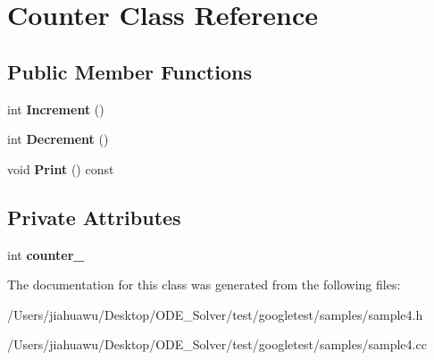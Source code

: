 \hypertarget{class_counter}{}\section{Counter Class Reference}
\label{class_counter}
\subsection*{Public Member Functions}
\begin{DoxyCompactItemize}
\item 
\mbox{\label{class_counter_a0a0ca9fdb580a2aec9a5a62ebed2b5ab}} 
int {\bfseries Increment} ()
\item 
\mbox{\label{class_counter_aa58d9b4f0bd96fc2331234493eb21bed}} 
int {\bfseries Decrement} ()
\item 
\mbox{\label{class_counter_a80092ec2a0deea0870b2e9f8ad0906bd}} 
void {\bfseries Print} () const
\end{DoxyCompactItemize}
\subsection*{Private Attributes}
\begin{DoxyCompactItemize}
\item 
\mbox{\label{class_counter_abdef0bf73f0a68177863c42c6eba2fc0}} 
int {\bfseries counter\+\_\+}
\end{DoxyCompactItemize}


The documentation for this class was generated from the following files\+:\begin{DoxyCompactItemize}
\item 
/\+Users/jiahuawu/\+Desktop/\+O\+D\+E\+\_\+\+Solver/test/googletest/samples/sample4.\+h\item 
/\+Users/jiahuawu/\+Desktop/\+O\+D\+E\+\_\+\+Solver/test/googletest/samples/sample4.\+cc\end{DoxyCompactItemize}
